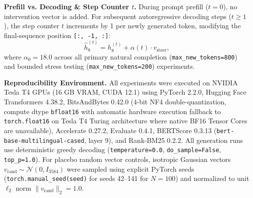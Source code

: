 \documentclass[conference]{IEEEtran}
\begin{document}
\textbf{Prefill vs. Decoding \& Step Counter $t$.} During prompt prefill ($t=0$), no intervention vector is added. For subsequent autoregressive decoding steps ($t \ge 1$), the step counter $t$ increments by 1 per newly generated token, modifying the final-sequence position \texttt{[:, -1, :]}:
\begin{equation}
\hat{h}_8^{(t)} = h_8^{(t)} + \alpha(t) \cdot v_{\text{steer}},
\end{equation}
where $\alpha_0 = 18.0$ across all primary natural completion (\texttt{max\_new\_tokens=800}) and bounded stress testing (\texttt{max\_new\_tokens=200}) experiments.


\textbf{Reproducibility Environment.} All experiments were executed on NVIDIA Tesla T4 GPUs (16 GB VRAM, CUDA 12.1) using PyTorch 2.2.0, Hugging Face Transformers 4.38.2, BitsAndBytes 0.42.0 (4-bit NF4 double-quantization, compute dtype \texttt{bfloat16} with automatic hardware execution fallback to \texttt{torch.float16} on Tesla T4 Turing architecture where native BF16 Tensor Cores are unavailable), Accelerate 0.27.2, Evaluate 0.4.1, BERTScore 0.3.13 (\texttt{bert-base-multilingual-cased}, layer 9), and Rank-BM25 0.2.2. All generation runs use deterministic greedy decoding (\texttt{temperature=0.0}, \texttt{do\_sample=False}, \texttt{top\_p=1.0}). For placebo random vector controls, isotropic Gaussian vectors $v_{\text{rand}} \sim \mathcal{N}(0, I_{3584})$ were sampled using explicit PyTorch seeds (\texttt{torch.manual\_seed(seed)} for seeds 42--141 for $N=100$) and normalized to unit $\ell_2$ norm $\|v_{\text{rand}}\|_2 = 1.0$.
\end{document}
